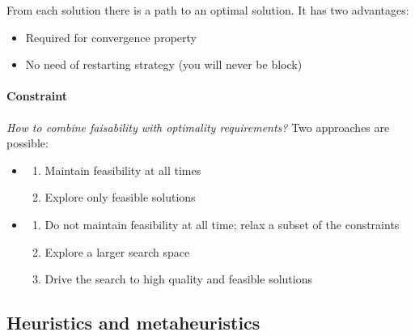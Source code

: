 From each solution  there is a path  to an optimal solution.  It has two
advantages:
\begin{itemize}
    \item Required for convergence property
    \item No need of restarting strategy (you will never be block)
\end{itemize}

\paragraph{Constraint}

\textit{How to combine faisability with optimality requirements?} Two approaches are possible:
\begin{itemize}
\item
	\begin{enumerate}
	\item Maintain feasibility at all times
	\item Explore only feasible solutions
	\end{enumerate}
\item 
	\begin{enumerate}
	\item Do not maintain feasibility at all time; relax a subset of the constraints
	\item Explore a larger search space
	\item Drive the search to high quality and feasible solutions
	\end{enumerate}
\end{itemize}

\subsection{Heuristics and metaheuristics}

